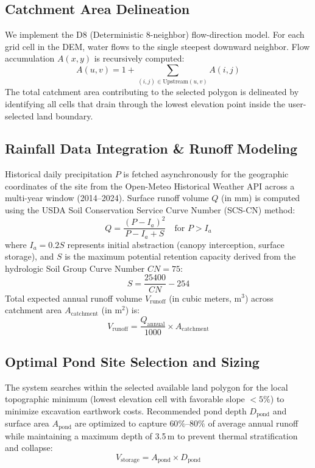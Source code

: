 \documentclass[manuscript,screen,review]{acmart}
\begin{document}
\subsection{Catchment Area Delineation}
We implement the D8 (Deterministic 8-neighbor) flow-direction model. For each grid cell in the DEM, water flows to the single steepest downward neighbor. Flow accumulation $A(x,y)$ is recursively computed:
\begin{equation}
A(u, v) = 1 + \sum_{(i,j) \in \text{Upstream}(u,v)} A(i, j)
\end{equation}
The total catchment area contributing to the selected polygon is delineated by identifying all cells that drain through the lowest elevation point inside the user-selected land boundary.

\subsection{Rainfall Data Integration \& Runoff Modeling}
Historical daily precipitation $P$ is fetched asynchronously for the geographic coordinates of the site from the Open-Meteo Historical Weather API across a multi-year window (2014--2024). Surface runoff volume $Q$ (in mm) is computed using the USDA Soil Conservation Service Curve Number (SCS-CN) method:
\begin{equation}
Q = \frac{(P - I_a)^2}{P - I_a + S} \quad \text{for } P > I_a
\end{equation}
where $I_a = 0.2S$ represents initial abstraction (canopy interception, surface storage), and $S$ is the maximum potential retention capacity derived from the hydrologic Soil Group Curve Number $CN = 75$:
\begin{equation}
S = \frac{25400}{CN} - 254
\end{equation}
Total expected annual runoff volume $V_{\text{runoff}}$ (in cubic meters, $\text{m}^3$) across catchment area $A_{\text{catchment}}$ (in $\text{m}^2$) is:
\begin{equation}
V_{\text{runoff}} = \frac{Q_{\text{annual}}}{1000} \times A_{\text{catchment}}
\end{equation}

\subsection{Optimal Pond Site Selection and Sizing}
The system searches within the selected available land polygon for the local topographic minimum (lowest elevation cell with favorable slope $< 5\%$) to minimize excavation earthwork costs. Recommended pond depth $D_{\text{pond}}$ and surface area $A_{\text{pond}}$ are optimized to capture $60\%$--$80\%$ of average annual runoff while maintaining a maximum depth of 3.5\,m to prevent thermal stratification and collapse:
\begin{equation}
V_{\text{storage}} = A_{\text{pond}} \times D_{\text{pond}}
\end{equation}
\end{document}
